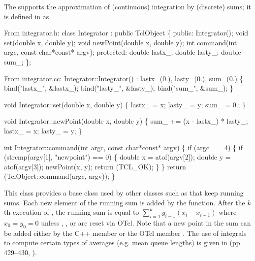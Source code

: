 The  
supports the approximation of (continuous) integration by (discrete)
sums; it is defined in  as
\begin{program}
{\rm From integrator.h:}
        class Integrator : public TclObject \{
        public:
                Integrator();
                void set(double x, double y);
                void newPoint(double x, double y);
                int command(int argc, const char*const* argv);
        protected:
                double lastx_;
                double lasty_;
                double sum_;
        \};

{\rm From integrator.cc:}
        Integrator::Integrator() : lastx_(0.), lasty_(0.), sum_(0.)
        \{
                bind("lastx_", &lastx_);
                bind("lasty_", &lasty_);
                bind("sum_", &sum_);
        \}

        void Integrator::set(double x, double y)
        \{
                lastx_ = x;
                lasty_ = y;
                sum_ = 0.;
        \}

        void Integrator::newPoint(double x, double y)
        \{
                sum_ += (x - lastx_) * lasty_;
                lastx_ = x;
                lasty_ = y;
        \}

        int Integrator::command(int argc, const char*const* argv)
        \{
                if (argc == 4) \{
                        if (strcmp(argv[1], "newpoint") == 0) \{
                                double x = atof(argv[2]);
                                double y = atof(argv[3]);
                                newPoint(x, y);
                                return (TCL_OK);
                        \}
                \}
                return (TclObject::command(argc, argv));
        \}
\end{program}
This class provides a base class used by other classes such
as  that keep running sums.
Each new element of the running sum is added by
the  function.
After the $k$th execution of , the running sum
is equal to $\sum_{i=1}^{k}y_{i-1}(x_i - x_{i-1})$ where
$x_0 = y_0 = 0$ unless , , or 
are reset via OTcl.
Note that a new point in the sum can be added either by the
C++ member  or the OTcl member .
The use of integrals to compute certain types of averages
(e.g. mean queue lengths) is given in (pp. 429--430, \cite{Jain91:Art}).


